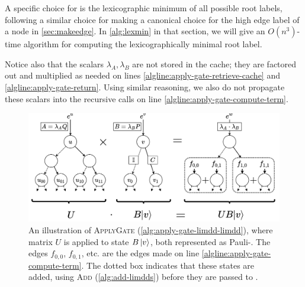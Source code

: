 A specific choice for \rootlabel is the lexicographic minimum of all possible root labels, following a similar choice for making a canonical choice for the high edge label of a node in \autoref{sec:makeedge}.
In \autoref{alg:lexmin} in that section, we will give an $O(n^3)$-time algorithm for computing the lexicographically minimal root label.

Notice also that the scalars $\lambda_A,\lambda_B$ are not stored in the cache; they are factored out and multiplied as needed on lines \ref{algline:apply-gate-retrieve-cache} and \ref{algline:apply-gate-return}.
Using similar reasoning, we also do not propagate these scalars into the recursive calls on line \ref{algline:apply-gate-compute-term}.

%
\begin{figure}
	\centering
	\includegraphics[width=.8\textwidth]{pics/apply-gate-2.pdf}
    \caption{An illustration of \textsc{ApplyGate} (\autoref{alg:apply-gate-limdd-limdd}), where matrix $U$ is applied to state $B\ket{v}$, both represented as Pauli-\limdds.
		The edges $f_{0,0}$, $f_{0,1}$, etc. are the edges made on line \ref{algline:apply-gate-compute-term}.
		The dotted box indicates that these states are added, using \textsc{Add} (\autoref{alg:add-limdds}) before they are passed to \makeedge.
}
	\label{fig:apply-gate}
\end{figure}

